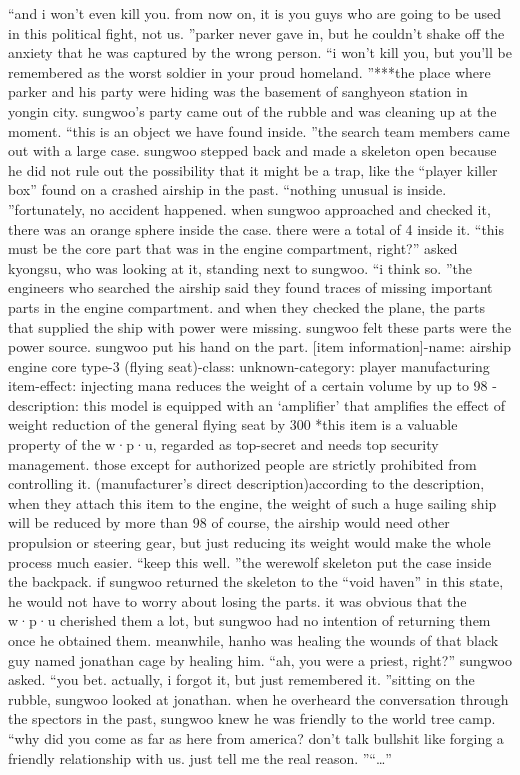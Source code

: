 “and i won’t even kill you.
 from now on, it is you guys who are going to be used in this political fight, not us.
”parker never gave in, but he couldn’t shake off the anxiety that he was captured by the wrong person.
“i won’t kill you, but you’ll be remembered as the worst soldier in your proud homeland.
”***the place where parker and his party were hiding was the basement of sanghyeon station in yongin city.
 sungwoo’s party came out of the rubble and was cleaning up at the moment.
“this is an object we have found inside.
”the search team members came out with a large case.
 sungwoo stepped back and made a skeleton open because he did not rule out the possibility that it might be a trap, like the “player killer box” found on a crashed airship in the past.
“nothing unusual is inside.
”fortunately, no accident happened.
 when sungwoo approached and checked it, there was an orange sphere inside the case.
 there were a total of 4 inside it.
“this must be the core part that was in the engine compartment, right?” asked kyongsu, who was looking at it, standing next to sungwoo.
“i think so.
”the engineers who searched the airship said they found traces of missing important parts in the engine compartment.
 and when they checked the plane, the parts that supplied the ship with power were missing.
 sungwoo felt these parts were the power source.
sungwoo put his hand on the part.
[item information]-name: airship engine core type-3 (flying seat)-class: unknown-category: player manufacturing item-effect: injecting mana reduces the weight of a certain volume by up to 98%
-description: this model is equipped with an ‘amplifier’ that amplifies the effect of weight reduction of the general flying seat by 300%
*this item is a valuable property of the w·p·u, regarded as top-secret and needs top security management.
 those except for authorized people are strictly prohibited from controlling it.
 (manufacturer’s direct description)according to the description, when they attach this item to the engine, the weight of such a huge sailing ship will be reduced by more than 98%
of course, the airship would need other propulsion or steering gear, but just reducing its weight would make the whole process much easier.
“keep this well.
”the werewolf skeleton put the case inside the backpack.
 if sungwoo returned the skeleton to the “void haven” in this state, he would not have to worry about losing the parts.
it was obvious that the w·p·u cherished them a lot, but sungwoo had no intention of returning them once he obtained them.
meanwhile, hanho was healing the wounds of that black guy named jonathan cage by healing him.
“ah, you were a priest, right?” sungwoo asked.
“you bet.
 actually, i forgot it, but just remembered it.
”sitting on the rubble, sungwoo looked at jonathan.
 when he overheard the conversation through the spectors in the past, sungwoo knew he was friendly to the world tree camp.
“why did you come as far as here from america? don’t talk bullshit like forging a friendly relationship with us.
 just tell me the real reason.
”“…”

